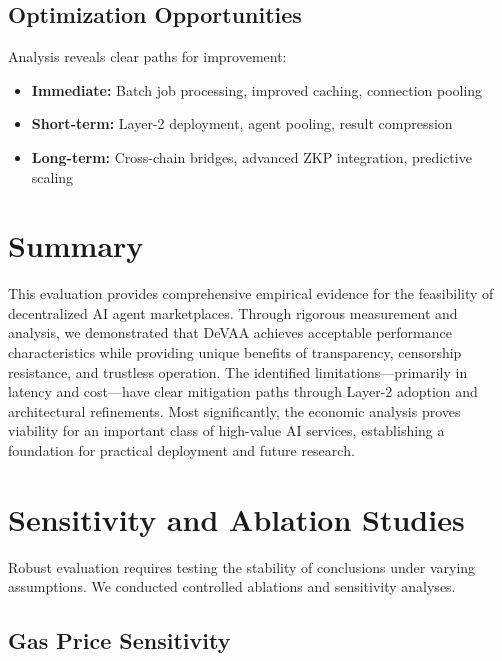 \subsection{Optimization Opportunities}

Analysis reveals clear paths for improvement:
\begin{itemize}
    \item \textbf{Immediate:} Batch job processing, improved caching, connection pooling
    \item \textbf{Short-term:} Layer-2 deployment, agent pooling, result compression
    \item \textbf{Long-term:} Cross-chain bridges, advanced ZKP integration, predictive scaling
\end{itemize}

\section{Summary}

This evaluation provides comprehensive empirical evidence for the feasibility of decentralized AI agent marketplaces. Through rigorous measurement and analysis, we demonstrated that DeVAA achieves acceptable performance characteristics while providing unique benefits of transparency, censorship resistance, and trustless operation. The identified limitations—primarily in latency and cost—have clear mitigation paths through Layer-2 adoption and architectural refinements. Most significantly, the economic analysis proves viability for an important class of high-value AI services, establishing a foundation for practical deployment and future research.

\section{Sensitivity and Ablation Studies}

Robust evaluation requires testing the stability of conclusions under varying assumptions. We conducted controlled ablations and sensitivity analyses.

\subsection{Gas Price Sensitivity}

